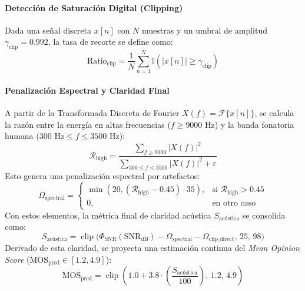 \documentclass[conference]{IEEEtran}
\begin{document}
\paragraph{Detección de Saturación Digital (Clipping)}
Dada una señal discreta $x[n]$ con $N$ muestras y un umbral de amplitud $\gamma_{\text{clip}} = 0.992$, la tasa de recorte se define como:
\begin{equation}
	\text{Ratio}_{\text{clip}} = \frac{1}{N} \sum_{n=1}^{N} \mathbb{I}\left( |x[n]| \ge \gamma_{\text{clip}} \right)
\end{equation}

\paragraph{Penalización Espectral y Claridad Final}
A partir de la Transformada Discreta de Fourier $X(f) = \mathcal{F}\{x[n]\}$, se calcula la razón entre la energía en altas frecuencias ($f \ge 9000 \text{ Hz}$) y la banda fonatoria humana ($300 \text{ Hz} \le f \le 3500 \text{ Hz}$):
\begin{equation}
	\mathcal{R}_{\text{high}} = \frac{\sum_{f \ge 9000} |X(f)|^2}{\sum_{300 \le f \le 3500} |X(f)|^2 + \varepsilon}
\end{equation}
Esto genera una penalización espectral por artefactos:
\begin{equation}
	\Omega_{\text{spectral}} = \begin{cases} \min(20, (\mathcal{R}_{\text{high}} - 0.45) \cdot 35), & \text{si } \mathcal{R}_{\text{high}} > 0.45 \\ 0, & \text{en otro caso} \end{cases}
\end{equation}
Con estos elementos, la métrica final de claridad acústica $S_{\text{acústica}}$ se consolida como:
\begin{equation}
	S_{\text{acústica}} = \operatorname{clip}\Big( \Phi_{\text{SNR}}(\text{SNR}_{\text{dB}}) - \Omega_{\text{spectral}} - \Omega_{\text{clip\_direct}}, \, 25, \, 98 \Big)
\end{equation}
Derivado de esta claridad, se proyecta una estimación continua del \textit{Mean Opinion Score} ($\text{MOS}_{\text{pred}} \in [1.2, 4.9]$):
\begin{equation}
	\text{MOS}_{\text{pred}} = \operatorname{clip}\left( 1.0 + 3.8 \cdot \left( \frac{S_{\text{acústica}}}{100} \right), \, 1.2, \, 4.9 \right)
\end{equation}
\end{document}
